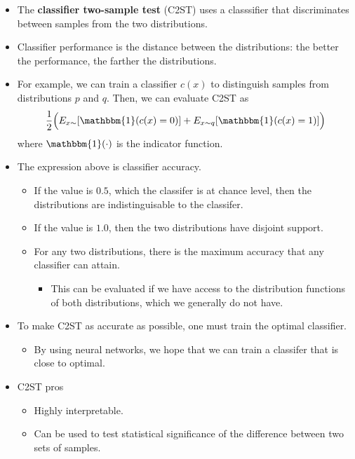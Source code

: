 \documentclass[10pt]{article}
\begin{document}
\begin{itemize}
    \item The {\bf classifier two-sample test} (C2ST) uses a classsifier that discriminates between samples from the two distributions.
    
    \item Classifier performance is the distance between the distributions: the better the performance, the farther the distributions.
    
    \item For example, we can train a classifier $c(x)$ to distinguish samples from distributions $p$ and $q$. Then, we can evaluate C2ST as
    \begin{align*}
        \frac{1}{2}\Big( E_{x \sim }[\mathbbm{1}(c(x) = 0)] + E_{x \sim q}[\mathbbm{1}(c(x) = 1)] \Big)
    \end{align*}
    where $\mathbbm{1}(\cdot)$ is the indicator function. 
        
    \item The expression above is classifier accuracy.
    \begin{itemize}
        \item If the value is $0.5$, which the classifer is at chance level, then the distributions are indistinguisable to the classifer.
        
        \item If the value is $1.0$, then the two distributions have disjoint support.
        
        \item For any two distributions, there is the maximum accuracy that any classifier can attain.
        \begin{itemize}
            \item This can be evaluated if we have access to the distribution functions of both distributions, which we generally do not have.
        \end{itemize}            
    \end{itemize}

    \item To make C2ST as accurate as possible, one must train the optimal classifier.
    \begin{itemize}
        \item By using neural networks, we hope that we can train a classifer that is close to optimal.
    \end{itemize}

    \item C2ST pros
    \begin{itemize}
        \item Highly interpretable.
        \item Can be used to test statistical significance of the difference between two sets of samples.
    \end{itemize}


\end{itemize}
\end{document}
